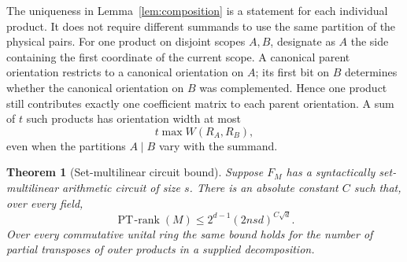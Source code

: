 \documentclass[11pt]{article}
\newtheorem{theorem}{Theorem}[section]
\theoremstyle{definition}
\theoremstyle{remark}
\newcommand{\PT}{\operatorname{PT\!\text{-}rank}}
\begin{document}
The uniqueness in Lemma~\ref{lem:composition} is a statement for
each individual product.  It does not require different summands
to use the same partition of the physical pairs.  For one product
on disjoint scopes $A,B$, designate as $A$ the side containing the
first coordinate of the current scope.  A canonical parent
orientation restricts to a canonical orientation on $A$; its first
bit on $B$ determines whether the canonical orientation on $B$
was complemented.  Hence one product still contributes exactly
one coefficient matrix to each parent orientation.  A sum of $t$
such products has orientation width at most
\[
 t\max W(R_A,R_B),
\]
even when the partitions $A\mid B$ vary with the summand.

\begin{theorem}[Set-multilinear circuit bound]
\label{thm:setmultilinear-circuit}
Suppose $F_M$ has a syntactically set-multilinear arithmetic circuit
of size $s$.  There is an absolute constant $C$ such that, over
every field,
\begin{equation}
\label{eq:setmultilinear-circuit}
 \PT(M)\le2^{d-1}(2nsd)^{C\sqrt d}.
\end{equation}
Over every commutative unital ring the same bound holds for the number of
partial transposes of outer products in a supplied decomposition.
\end{theorem}
\end{document}
